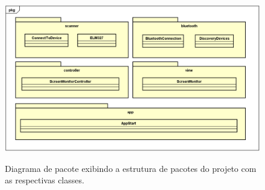 \begin{figure}[!ht]
\centering
\caption{Diagrama de pacote exibindo a estrutura de pacotes do projeto com as respectivas classes.} 
{\includegraphics[scale=.42]{imagens/estruturacaoPacotes.png}}\\
 \label{Fig:diagrama_classe}
\end{figure}


